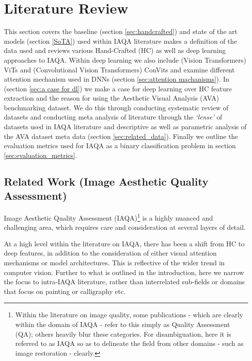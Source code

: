 
    
\chapter{Literature Review} 
\label{chap:Literature_Review}
This section covers the baseline (section \ref{sec:handcrafted}) and state of the art models (section \ref{SoTA})  used within IAQA literature makes a definition of the data used and reviews various Hand-Crafted (HC) as well as deep learning approaches to IAQA. Within deep learning we also include (Vision Transformers) ViTs and (Convolutional Vision Transformers) ConVits  and examine different attention mechanism used in DNNs (section \ref{sec:attention machanisms}). In (section \ref{sec:a case for dl})  we make a case for deep learning over HC feature extraction and the reason for using the Aesthetic Visual Analysis (AVA) benchmarking dataset. We do this through conducting systematic review of datasets and conducting meta analysis of literature through the \textit{`lense'} of datasets used in IAQA literature and descriptive as well as parametric analysis of the AVA dataset meta data (section \ref{sec:related_data}). Finally we outline the evaluation metrics used for IAQA as a binary classification problem in section \ref{sec:evaluation_metrics}. 


\section{Related Work (Image Aesthetic Quality Assessment)}
\label{related_work}


Image Aesthetic Quality Assessment (IAQA)\footnote{Within the literature on image quality, some publications - which are clearly within the domain of IAQA - refer to this simply as Quality Assessment (QA)\cite{Chang2017}; others heavily blur these categories\cite{Kanwal2021}. For disambiguation, here it is referred to as IAQA so as to delineate the field from other domains - such as image restoration - clearly.} is a highly nuanced and challenging area, which requires care and consideration at several layers of detail. 

\par At a high level within the literature on IAQA, there has been a shift from HC to deep features, in addition to the consideration of either visual attention mechanisms or model architectures. This is reflective of the wider trend in computer vision. Further to what is outlined in the introduction, here we narrow the focus to intra-IAQA literature, rather than interrelated sub-fields or domains that focus on painting or calligraphy\cite{Fernando2021,Sun2015} etc.

